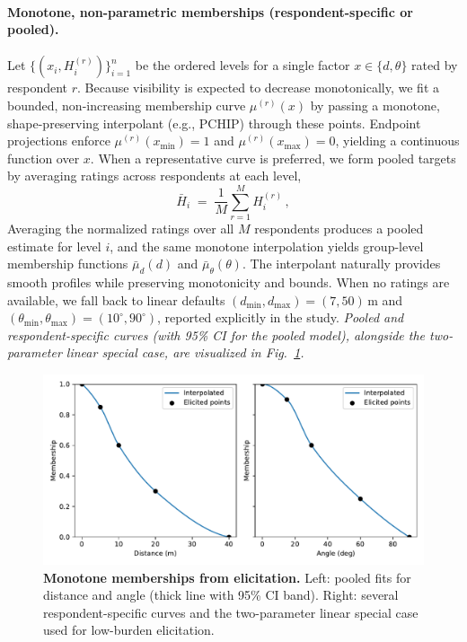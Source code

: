 \documentclass[final,3p,times,review]{elsarticle}
\begin{document}
\paragraph{Monotone, non-parametric memberships (respondent-specific or pooled).}
Let $\{(x_i,H^{(r)}_i)\}_{i=1}^{n}$ be the ordered levels for a single factor $x\!\in\!\{d,\theta\}$ rated by respondent $r$. Because visibility is expected to decrease monotonically, we fit a bounded, non-increasing membership curve $\mu^{(r)}(x)$ by passing a monotone, shape-preserving interpolant (e.g., PCHIP) through these points. Endpoint projections enforce $\mu^{(r)}(x_{\min}) = 1$ and $\mu^{(r)}(x_{\max}) = 0$, yielding a continuous function over $x$. When a representative curve is preferred, we form pooled targets by averaging ratings across respondents at each level,
\begin{equation}
\bar{H}_i \;=\; \frac{1}{M}\sum_{r=1}^{M} H^{(r)}_i \,,
\label{eq:pooled-mean}
\end{equation}
Averaging the normalized ratings over all $M$ respondents produces a pooled estimate for level $i$, and the same monotone interpolation yields group-level membership functions $\bar{\mu}_d(d)$ and $\bar{\mu}_\theta(\theta)$. The interpolant naturally provides smooth profiles while preserving monotonicity and bounds. When no ratings are available, we fall back to linear defaults $(d_{\min},d_{\max})=(7,50)$\,m and $(\theta_{\min},\theta_{\max})=(10^\circ,90^\circ)$, reported explicitly in the study. \textit{Pooled and respondent-specific curves (with 95\% CI for the pooled model), alongside the two-parameter linear special case, are visualized in Fig.~\ref{fig:memberships}.}

\begin{figure}[t]
  \centering
  \includegraphics[width=\linewidth]{fig6_memberships.pdf}
  \caption{\textbf{Monotone memberships from elicitation.} Left: pooled fits for distance and angle (thick line with 95\% CI band). Right: several respondent-specific curves and the two-parameter linear special case used for low-burden elicitation.}
  \label{fig:memberships}
\end{figure}
\end{document}
